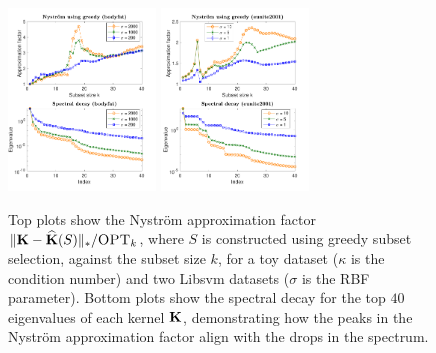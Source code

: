 \documentclass{article}
\begin{document}
\begin{figure}[t]
   \hspace{-6mm}
  \includegraphics[width=0.35\textwidth]{figs/nystrom/rbf-bodyfat-greedy}
  \hspace{-6mm}
  \includegraphics[width=0.35\textwidth]{figs/nystrom/rbf-eunite2001-greedy}
  \vspace{-10mm}
  \fi
  \caption{Top plots show the Nystr\"om approximation factor
    $\|\mathbf K-{\widehat{\mathbf K}}(S)\|_*/{\textsc{OPT}_k}$,
    where $S$ is constructed using greedy subset selection,
    against the subset size $k$, for a toy dataset
    ($\kappa$ is the condition number) and two
    Libsvm datasets ($\sigma$ is the RBF parameter). Bottom plots show
    the spectral decay for  the top $40$ eigenvalues  of each kernel
    $\mathbf K$,  demonstrating how the peaks in the Nystr\"om approximation
    factor align with the drops in the spectrum.}
\vspace{-2mm}
  \label{f:greedy}
\end{figure}
\end{document}
